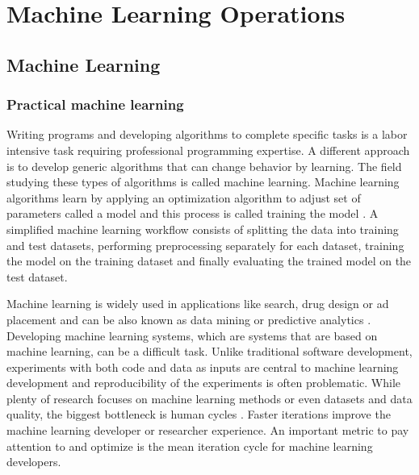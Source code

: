 \chapter{Machine Learning Operations}
\label{chap:mloper}


\section{Machine Learning} %
\label{sec:ml}

\subsection{Practical machine learning }

Writing programs and developing algorithms to complete specific tasks is a labor intensive task requiring professional programming expertise.
A different approach is to develop generic algorithms that can change behavior by learning.
The field studying these types of algorithms is called machine learning.
Machine learning algorithms learn by applying an optimization algorithm to adjust set of parameters called a model and this process is called training the model \parencite{lecunDeepLearning2015}. %
A simplified machine learning workflow consists of splitting the data into training and test datasets, performing preprocessing separately for each dataset, training the model on the training dataset and finally evaluating the trained model on the test dataset.  %


Machine learning is widely used in applications like search, drug design or ad placement and can be also known as data mining or predictive analytics \parencite{domingosFewUsefulThings2012}. Developing machine learning systems, which are systems that are based on machine learning, can be a difficult task. Unlike traditional software development, experiments with both code and data as inputs are central to machine learning development \parencite{zahariaAcceleratingMachineLearning2018} and reproducibility of the experiments is often problematic. While plenty of research focuses on machine learning methods or even datasets and data quality, the biggest bottleneck is human cycles \parencite{domingosFewUsefulThings2012}. Faster iterations improve the machine learning developer or researcher experience. An important metric to pay attention to and optimize is the mean iteration cycle for machine learning developers.

